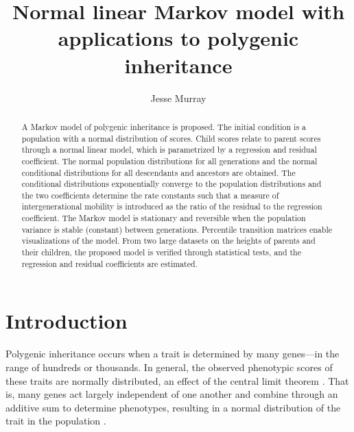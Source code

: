 \documentclass{svproc} %
\begin{document}
\mainmatter              %

\title{Normal linear Markov model with applications to polygenic inheritance}

\author{Jesse Murray}



\maketitle   %

\begin{abstract} %
A Markov model of polygenic inheritance is proposed. The initial condition is a population with a normal distribution of scores. Child scores relate to parent scores through a normal linear model, which is parametrized by a regression and residual coefficient. The normal population distributions for all generations and the normal conditional distributions for all descendants and ancestors are obtained. The conditional distributions exponentially converge to the population distributions and the two coefficients determine the rate constants such that a measure of intergenerational mobility is introduced as the ratio of the residual to the regression coefficient. The Markov model is stationary and reversible when the population variance is stable (constant) between generations. Percentile transition matrices enable visualizations of the model. From two large datasets on the heights of parents and their children, the proposed model is verified through statistical tests, and the regression and residual coefficients are estimated.
%
\end{abstract}



\section{Introduction}

Polygenic inheritance occurs when a trait is determined by many genes---in the range of hundreds or thousands. In general, the observed phenotypic scores of these traits are normally distributed, an effect of the central limit theorem \cite{rieger, lange_article}. That is, many genes act largely independent of one another and combine through an additive sum to determine phenotypes, resulting in a normal distribution of the trait in the population \cite{lange_book}. 
\end{document}
